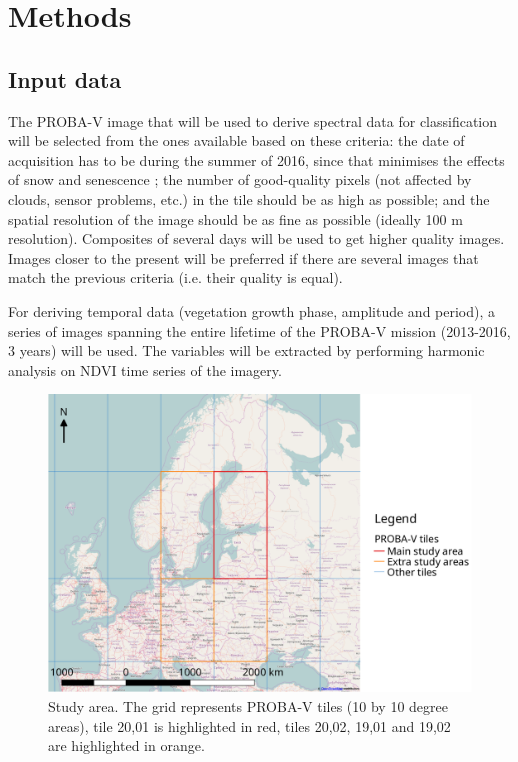 \documentclass[a4paper,10pt]{article}
\begin{document}
\section{Methods}

\subsection{Input data}

The PROBA-V image that will be used to derive spectral data for classification will be selected from the ones available based on these criteria: the date of acquisition has to be during the summer of 2016, since that minimises the effects of snow and senescence \citep{bartalev2014probavboreal}; the number of good-quality pixels (not affected by clouds, sensor problems, etc.) in the tile should be as high as possible; and the spatial resolution of the image should be as fine as possible (ideally 100 m resolution). Composites of several days will be used to get higher quality images. Images closer to the present will be preferred if there are several images that match the previous criteria (i.e. their quality is equal).

For deriving temporal data (vegetation growth phase, amplitude and period), a series of images spanning the entire lifetime of the PROBA-V mission (2013-2016, 3 years) will be used. The variables will be extracted by performing harmonic analysis \citep{rayner1971introduction,jakubauskas2001harmonic} on NDVI time series of the imagery.

\begin{figure}
 \includegraphics[width=\textwidth]{./proposal-figures/studyarea.png}
 \caption{Study area. The grid represents PROBA-V tiles (10 by 10 degree areas), tile 20,01 is highlighted in red, tiles 20,02, 19,01 and 19,02 are highlighted in orange.}
 \label{AOI}
\end{figure} 
\end{document}
